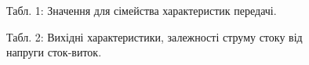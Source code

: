 \documentclass[a4paper,14pt]{extreport}
\begin{document}
\begin{figure}[h]
  \begin{center}Табл. 1: Значення для сімейства характеристик передачі.\end{center}

\label{ris1}
\end{figure}
\begin{figure}[h]
  \begin{center}Табл. 2: Вихідні характеристики, залежності струму стоку від напруги сток-виток.\end{center}

\label{ris1}
\end{figure}
\end{document}
